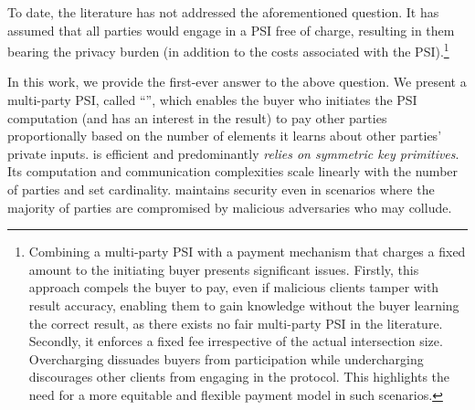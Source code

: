 To date, the literature has not addressed the aforementioned question. It has assumed that all parties would engage in a PSI free of charge, resulting in them bearing the privacy burden (in addition to the costs associated with the PSI).\footnote{Combining a multi-party PSI with a payment mechanism that charges a fixed amount to the initiating buyer presents significant issues. Firstly, this approach compels the buyer to pay, even if malicious clients tamper with result accuracy, enabling them to gain knowledge without the buyer learning the correct result, as there exists no fair multi-party PSI in the literature. Secondly, it enforces a fixed fee irrespective of the actual intersection size. Overcharging dissuades buyers from participation while undercharging discourages other clients from engaging in the protocol. This highlights the need for a more equitable and flexible payment model in such scenarios.}


%
In this work, we provide the first-ever answer to the above question. We present a multi-party PSI, called ``\withRew'', which enables the buyer who initiates the PSI computation (and has an interest in the result) to pay other parties proportionally based on the number of elements it learns about other parties' private inputs. 
%
%
\withRew is efficient and predominantly \emph{relies on symmetric key primitives}.  Its computation and communication complexities  scale linearly with  the number of parties and set cardinality. \withRew maintains security even in scenarios where the majority of parties are compromised by malicious adversaries who may collude.




